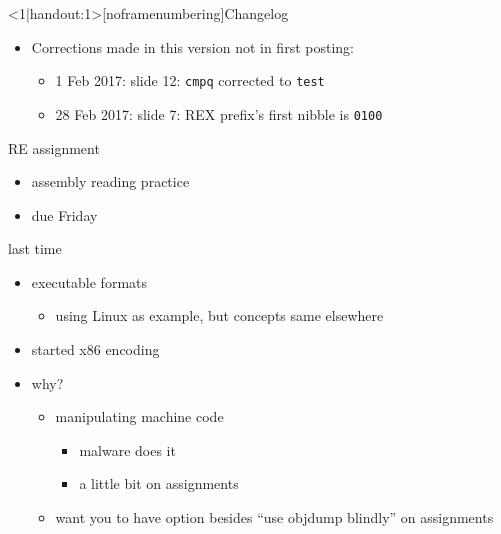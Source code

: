 \begin{frame}
    \titlepage
\end{frame}

{
\begin{frame}<1|handout:1>[noframenumbering]{Changelog}
    \begin{itemize}
        \item Corrections made in this version not in first posting:
        \begin{itemize}
        \item 1 Feb 2017: slide 12: {\tt cmpq} corrected to {\tt test}
        \item 28 Feb 2017: slide 7: REX prefix's first nibble is {\tt 0100}
        \end{itemize}
    \end{itemize}
\end{frame}
}

\begin{frame}{RE assignment}
    \begin{itemize}
    \item assembly reading practice
    \item due Friday
    \end{itemize}
\end{frame}

\begin{frame}{last time}
    \begin{itemize}
    \item executable formats
        \begin{itemize}
        \item using Linux as example, but concepts same elsewhere
        \end{itemize}
    \item started x86 encoding
    \item why?
        \begin{itemize}
        \item manipulating machine code 
            \begin{itemize}
            \item malware does it
            \item a little bit on assignments
            \end{itemize}
        \item want you to have option besides ``use objdump blindly'' on assignments
        \end{itemize} 
    \end{itemize}
\end{frame}

